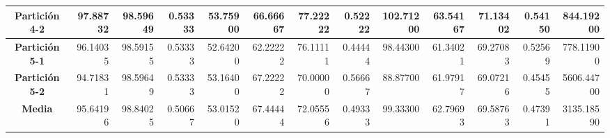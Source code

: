 \documentclass[a4paper,11pt]{article}
\begin{document}
\begin{table}[H]
\begin{adjustbox}{width=1.1\textwidth}
\begin{tabular}{|c|r|r|r|r|r|r|r|r|r|r|r|r|}
    \textbf{Partición 4-2} & 97.88732 & 98.59649 & 0.53333 & 53.75900 & 66.66667 & 77.22222 & 0.52222 & 102.71200 & 63.54167 & 71.13402 & 0.54150 & 844.19200 \\ \hline
    \textbf{Partición 5-1} & 96.14035 & 98.59155 & 0.53333 & 52.64200 & 62.22222 & 76.11111 & 0.44444 & 98.44300 & 61.34021 & 69.27083 & 0.52569 & 778.11900 \\ \hline
    \textbf{Partición 5-2} & 94.71831 & 98.59649 & 0.53333 & 53.16400 & 67.22222 & 70.00000 & 0.56667 & 88.87700 & 61.97917 & 69.07216 & 0.45455 & 5606.44700 \\ \hline
    \textbf{Media} & 95.64196 & 98.84025 & 0.50667 & 53.01520 & 67.44444 & 72.05556 & 0.49333 & 99.33300 & 62.79693 & 69.58763 & 0.47391 & 3135.18590 \\ \hline
    \end{tabular}
    \end{adjustbox}
    \label{BText}
  \end{table}  
  
\end{document}
